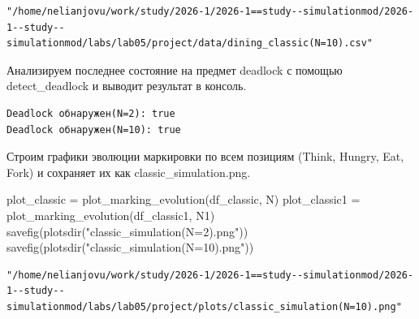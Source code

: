 \documentclass[
  12pt,
  a4paper,
  DIV=11,
  numbers=noendperiod]{scrreprt}
\newenvironment{Shaded}{\begin{snugshade}}{\end{snugshade}}
\newcommand{\FunctionTok}[1]{\textcolor[rgb]{0.28,0.35,0.67}{#1}}
\newcommand{\NormalTok}[1]{\textcolor[rgb]{0.00,0.23,0.31}{#1}}
\newcommand{\OperatorTok}[1]{\textcolor[rgb]{0.37,0.37,0.37}{#1}}
\newcommand{\SpecialCharTok}[1]{\textcolor[rgb]{0.37,0.37,0.37}{#1}}
\newcommand{\StringTok}[1]{\textcolor[rgb]{0.13,0.47,0.30}{#1}}
\begin{document}
\begin{verbatim}
"/home/nelianjovu/work/study/2026-1/2026-1==study--simulationmod/2026-1--study--simulationmod/labs/lab05/project/data/dining_classic(N=10).csv"
\end{verbatim}

Анализируем последнее состояние на предмет deadlock с помощью
detect\_deadlock и выводит результат в консоль.

\begin{Shaded}
\end{Shaded}

\begin{verbatim}
Deadlock обнаружен(N=2): true
Deadlock обнаружен(N=10): true
\end{verbatim}

Строим графики эволюции маркировки по всем позициям (Think, Hungry, Eat,
Fork) и сохраняет их как classic\_simulation.png.

\begin{Shaded}
\begin{Highlighting}[]
\NormalTok{plot\_classic }\OperatorTok{=} \FunctionTok{plot\_marking\_evolution}\NormalTok{(df\_classic, N)}
\NormalTok{plot\_classic1 }\OperatorTok{=} \FunctionTok{plot\_marking\_evolution}\NormalTok{(df\_classic1, N1)}
\FunctionTok{savefig}\NormalTok{(}\FunctionTok{plotsdir}\NormalTok{(}\StringTok{"classic\_simulation(N=2).png"}\NormalTok{))}
\FunctionTok{savefig}\NormalTok{(}\FunctionTok{plotsdir}\NormalTok{(}\StringTok{"classic\_simulation(N=10).png"}\NormalTok{))}
\end{Highlighting}
\end{Shaded}

\begin{verbatim}
"/home/nelianjovu/work/study/2026-1/2026-1==study--simulationmod/2026-1--study--simulationmod/labs/lab05/project/plots/classic_simulation(N=10).png"
\end{verbatim}
\end{document}
